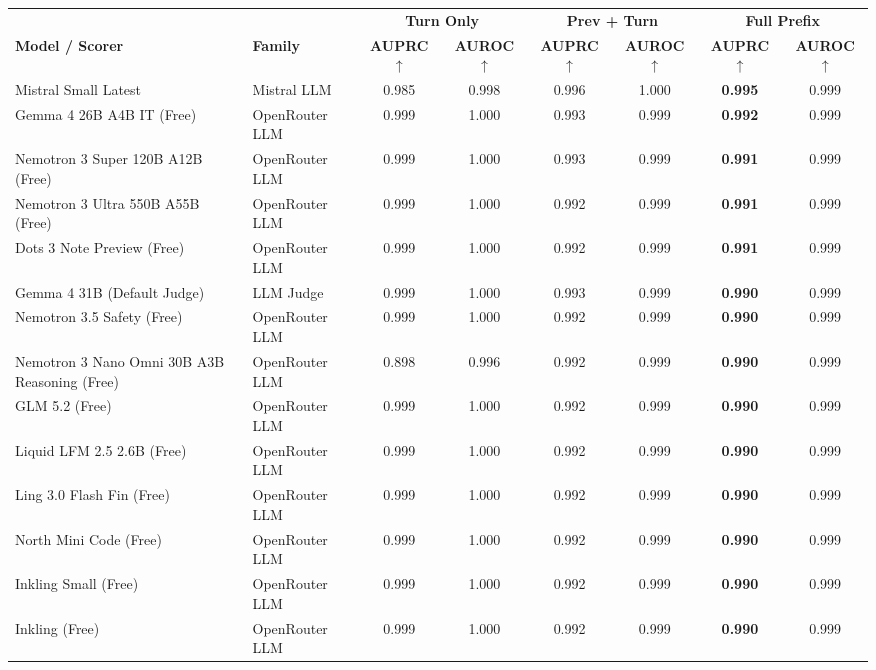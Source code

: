 \begin{table}[t]
\centering
\small
\begin{tabular}{llcccccc}
\toprule
 & & \multicolumn{2}{c}{\textbf{Turn Only}} & \multicolumn{2}{c}{\textbf{Prev + Turn}} & \multicolumn{2}{c}{\textbf{Full Prefix}} \\
\cmidrule(lr){3-4} \cmidrule(lr){5-6} \cmidrule(lr){7-8}
\textbf{Model / Scorer} & \textbf{Family} & \textbf{AUPRC} $\uparrow$ & \textbf{AUROC} $\uparrow$ & \textbf{AUPRC} $\uparrow$ & \textbf{AUROC} $\uparrow$ & \textbf{AUPRC} $\uparrow$ & \textbf{AUROC} $\uparrow$ \\
\midrule
Mistral Small Latest & Mistral LLM & 0.985 & 0.998 & 0.996 & 1.000 & \textbf{0.995} & 0.999 \\
Gemma 4 26B A4B IT (Free) & OpenRouter LLM & 0.999 & 1.000 & 0.993 & 0.999 & \textbf{0.992} & 0.999 \\
Nemotron 3 Super 120B A12B (Free) & OpenRouter LLM & 0.999 & 1.000 & 0.993 & 0.999 & \textbf{0.991} & 0.999 \\
Nemotron 3 Ultra 550B A55B (Free) & OpenRouter LLM & 0.999 & 1.000 & 0.992 & 0.999 & \textbf{0.991} & 0.999 \\
Dots 3 Note Preview (Free) & OpenRouter LLM & 0.999 & 1.000 & 0.992 & 0.999 & \textbf{0.991} & 0.999 \\
Gemma 4 31B (Default Judge) & LLM Judge & 0.999 & 1.000 & 0.993 & 0.999 & \textbf{0.990} & 0.999 \\
Nemotron 3.5 Safety (Free) & OpenRouter LLM & 0.999 & 1.000 & 0.992 & 0.999 & \textbf{0.990} & 0.999 \\
Nemotron 3 Nano Omni 30B A3B Reasoning (Free) & OpenRouter LLM & 0.898 & 0.996 & 0.992 & 0.999 & \textbf{0.990} & 0.999 \\
GLM 5.2 (Free) & OpenRouter LLM & 0.999 & 1.000 & 0.992 & 0.999 & \textbf{0.990} & 0.999 \\
Liquid LFM 2.5 2.6B (Free) & OpenRouter LLM & 0.999 & 1.000 & 0.992 & 0.999 & \textbf{0.990} & 0.999 \\
Ling 3.0 Flash Fin (Free) & OpenRouter LLM & 0.999 & 1.000 & 0.992 & 0.999 & \textbf{0.990} & 0.999 \\
North Mini Code (Free) & OpenRouter LLM & 0.999 & 1.000 & 0.992 & 0.999 & \textbf{0.990} & 0.999 \\
Inkling Small (Free) & OpenRouter LLM & 0.999 & 1.000 & 0.992 & 0.999 & \textbf{0.990} & 0.999 \\
Inkling (Free) & OpenRouter LLM & 0.999 & 1.000 & 0.992 & 0.999 & \textbf{0.990} & 0.999 \\

\end{tabular}
\end{table}

